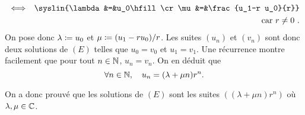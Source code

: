 \documentclass{magnoliaold}
\begin{document}
\begin{preuve}
\begin{itemize}
\begin{itemize}
\begin{eqnarray*}
&\ssi& \syslin{\lambda&=&u_0\hfill\cr \mu&=&\frac{u_1-r u_0}{r}}\\
&    & \text{car $r\neq 0$ .}
\end{eqnarray*}
On pose donc $\lambda\coloneqq u_0$ et $\mu\coloneqq(u_1-r u_0)/r$. Les suites $(u_n)$ et $(v_n)$ sont donc deux solutions de $(E)$ telles que $u_0=v_0$ et $u_1=v_1$. Une récurrence montre facilement que pour tout $n\in\mathbb{N}$, $u_n=v_n$. On en déduit que
\[\forall n\in\mathbb{N},\quad u_n=(\lambda +\mu n)r^n.\]
\end{itemize}
On a donc prouvé que les solutions de $(E)$ sont les suites $((\lambda+\mu n)r^n)$ où $\lambda,\mu\in\mathbb{C}$.
\end{itemize}






\end{preuve}
\end{document}
